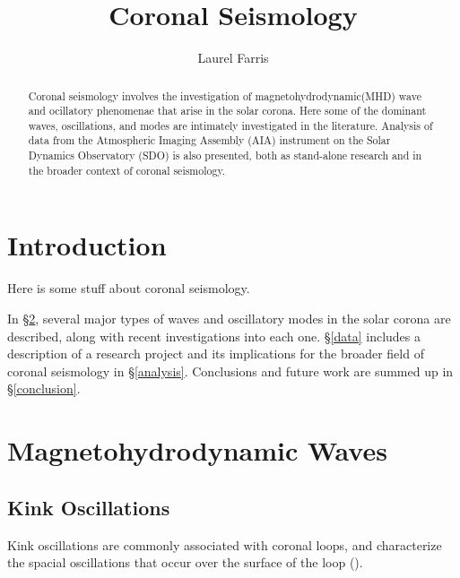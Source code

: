\documentclass[preprint2]{aastex}
\newcommand{\mhd}{magnetohydrodynamic}
\begin{document}
\title{\vspace{-0.75in}Coronal Seismology}
\author{\vspace{-0.25in}Laurel Farris}

\begin{abstract}
Coronal seismology involves the investigation of \mhd (MHD) wave and
ocillatory phenomenae that arise in the solar corona. Here some of the
dominant waves, oscillations, and modes are intimately investigated in
the literature. Analysis of data from the Atmospheric Imaging
Assembly (AIA) instrument on the Solar Dynamics Observatory (SDO) is
also presented, both as stand-alone research and in the broader
context of coronal seismology.
\end{abstract}

\section{Introduction}\label{intro}
Here is some stuff about coronal seismology.

In \S\ref{MHD}, several major types of waves and oscillatory modes in
the solar corona are described, along with recent investigations into
each one. \S\ref{data} includes a description of a research project and
its implications for the broader field of coronal seismology in
\S\ref{analysis}. Conclusions and future work are summed up in
\S\ref{conclusion}.

\section{Magnetohydrodynamic Waves}\label{MHD}

\subsection{Kink Oscillations}
Kink oscillations are commonly associated with coronal loops, and
characterize the spacial oscillations that occur over the surface of
the loop (\cite{Nak}).


\end{document}
